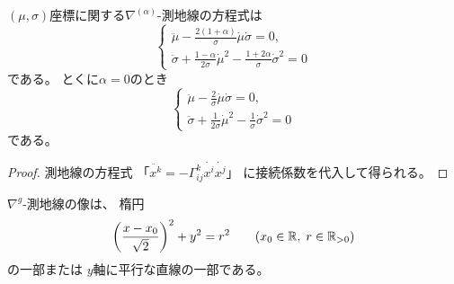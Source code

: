 \documentclass[report]{jlreq}
\begin{document}
\begin{proposition}[測地線方程式]
    $(\mu, \sigma)$座標に関する$\nabla^{(\alpha)}$-測地線の方程式は
    \begin{equation}
        \begin{cases}
            \ddot{\mu}
                - \frac{2 (1 + \alpha)}{\sigma} \dot{\mu} \dot{\sigma}
                = 0,
                \\
            \ddot{\sigma}
                + \frac{1 - \alpha}{2 \sigma} \dot{\mu}^2
                - \frac{1 + 2 \alpha}{\sigma} \dot{\sigma}^2
                = 0
        \end{cases}
    \end{equation}
    である。
    とくに$\alpha = 0$のとき
    \begin{equation}
        \begin{cases}
            \ddot{\mu}
                - \frac{2}{\sigma} \dot{\mu} \dot{\sigma}
                = 0,
                \\
            \ddot{\sigma}
                + \frac{1}{2 \sigma} \dot{\mu}^2
                - \frac{1}{\sigma} \dot{\sigma}^2
                = 0
        \end{cases}
    \end{equation}
    である。
\end{proposition}

\begin{proof}
    測地線の方程式
    「$\ddot{x^k} = - {\Gamma}_{ij}^k \dot{x^i} \dot{x^j}$」
    に接続係数を代入して得られる。
\end{proof}

\begin{proposition}
    $\nabla^g$-測地線の像は、
    楕円
    \begin{equation}
        \left({
            \frac{x - x_0}{\sqrt{2}}
        }\right)^2
            + y^2 = r^2
            \qquad
            (x_0 \in \mathbb{R}, \; r \in \mathbb{R}_{> 0})
    \end{equation}
    の一部または
    $y$軸に平行な直線の一部である。
\end{proposition}
\end{document}
